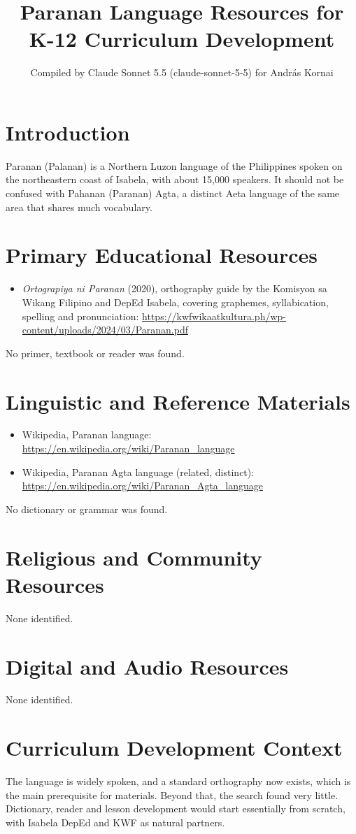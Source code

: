 \documentclass[12pt]{article}
\title{Paranan Language Resources for K-12 Curriculum Development}
\author{Compiled by Claude Sonnet 5.5 (claude-sonnet-5-5) for Andr\'as Kornai}
\date{}
\begin{document}
\maketitle

\section{Introduction}
Paranan (Palanan) is a Northern Luzon language of the Philippines spoken on the northeastern coast of Isabela, with about 15,000 speakers. It should not be confused with Pahanan (Paranan) Agta, a distinct Aeta language of the same area that shares much vocabulary.

\section{Primary Educational Resources}
\begin{itemize}
\item \emph{Ortograpiya ni Paranan} (2020), orthography guide by the Komisyon sa Wikang Filipino and DepEd Isabela, covering graphemes, syllabication, spelling and pronunciation: \url{https://kwfwikaatkultura.ph/wp-content/uploads/2024/03/Paranan.pdf}
\end{itemize}
No primer, textbook or reader was found.

\section{Linguistic and Reference Materials}
\begin{itemize}
\item Wikipedia, Paranan language: \url{https://en.wikipedia.org/wiki/Paranan_language}
\item Wikipedia, Paranan Agta language (related, distinct): \url{https://en.wikipedia.org/wiki/Paranan_Agta_language}
\end{itemize}
No dictionary or grammar was found.

\section{Religious and Community Resources}
None identified.

\section{Digital and Audio Resources}
None identified.

\section{Curriculum Development Context}
The language is widely spoken, and a standard orthography now exists, which is the main prerequisite for materials. Beyond that, the search found very little. Dictionary, reader and lesson development would start essentially from scratch, with Isabela DepEd and KWF as natural partners.
\end{document}
